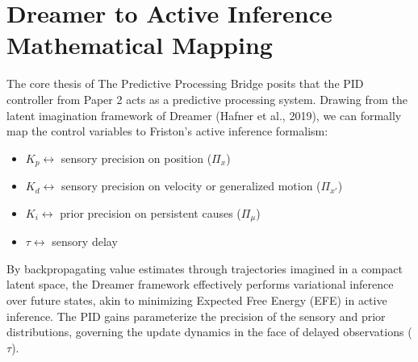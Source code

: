 \section{Dreamer to Active Inference Mathematical Mapping}

The core thesis of The Predictive Processing Bridge posits that the PID controller from Paper 2 acts as a predictive processing system. Drawing from the latent imagination framework of Dreamer (Hafner et al., 2019), we can formally map the control variables to Friston's active inference formalism:

\begin{itemize}
    \item $K_p \leftrightarrow$ sensory precision on position ($\Pi_x$)
    \item $K_d \leftrightarrow$ sensory precision on velocity or generalized motion ($\Pi_{x'}$)
    \item $K_i \leftrightarrow$ prior precision on persistent causes ($\Pi_\mu$)
    \item $\tau \leftrightarrow$ sensory delay
\end{itemize}

By backpropagating value estimates through trajectories imagined in a compact latent space, the Dreamer framework effectively performs variational inference over future states, akin to minimizing Expected Free Energy (EFE) in active inference. The PID gains parameterize the precision of the sensory and prior distributions, governing the update dynamics in the face of delayed observations ($\tau$).
